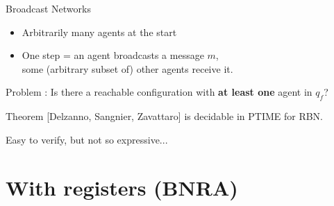 \documentclass{beamer}
\begin{document}
\begin{frame}{Broadcast Networks}
%	
	
	\begin{itemize}
		\item Arbitrarily many agents at the start
		
		\item One step = an agent broadcasts a message $m$,\\ some (arbitrary subset of) other agents receive it.
	\end{itemize}
	
	\pause 
	
	\begin{block}{Problem}
		{}: Is there a reachable configuration with \textbf{at least one} agent in \color{blue!60}$q_f$\color{black}?
		
	\end{block}
	
	\pause
	
	\begin{block}{Theorem [Delzanno, Sangnier, Zavattaro]}
		{} is decidable in PTIME for RBN.
		
	\end{block}
	
	\pause Easy to verify, but not so expressive...
	
\end{frame}

\section{With registers (BNRA)}


\begin{frame}
	\tableofcontents[currentsection]
\end{frame}
\end{document}
